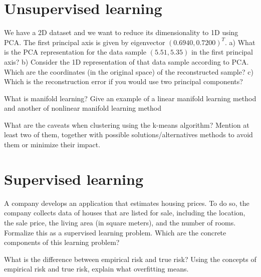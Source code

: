 \documentclass[11pt]{article}
\newcounter{marks}
\begin{document}
\section*{Unsupervised learning}
\begin{list}{{\bf Question 2.:}}
	{
	}

\item
{}
\addtocounter{marks}{1}
We have a 2D dataset and we want to reduce its dimensionality to 1D using PCA. The first principal axis is given by eigenvector $(0.6940, 0.7200)^T$. a) What is the PCA representation for the data sample $(5.51,5.35)$ in the first principal axis? b) Consider the 1D representation of that data sample according to PCA. Which are the coordinates (in the original space) of the reconstructed sample? c) Which is the reconstruction error if you  would use two principal components?   

\item
{}
\addtocounter{marks}{1}
What is manifold learning? Give an example of a linear manifold learning method and another of nonlinear manifold learning method 

\item
{}
\addtocounter{marks}{1}
What are the caveats when clustering using the k-means algorithm? Mention at least two of them, together with possible solutions/alternatives methods to avoid them or minimize their impact.
\end{list}

\section*{Supervised learning}
\begin{list}{{\bf Question 3.:}}
	{
	}

\item
{}
\addtocounter{marks}{1}
A company develops an application that estimates housing prices. To do so, the company collects data of houses that are listed for sale, including the location, the sale price, the living area (in square meters), and the number of rooms. Formalize this as a supervised learning problem. Which are the concrete components of this learning problem?

\item
{}
\addtocounter{marks}{1}
What is the difference between empirical risk and true risk? Using the concepts of empirical risk and true risk, explain what overfitting means.

\end{list}
\end{document}
